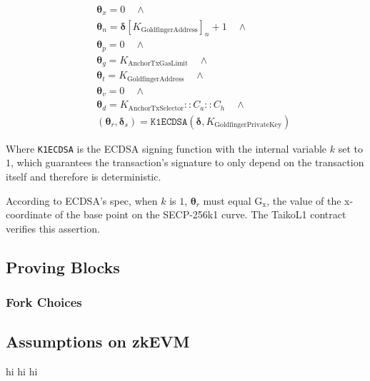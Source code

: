 \documentclass[9pt,oneside]{amsart}
\begin{document}
\begin{multicols}{2}
\begin{eqnarray}
& & \boldsymbol{\theta}_x = 0 \quad \wedge \\
\nonumber& & \boldsymbol{\theta}_n = \boldsymbol{\delta}[K_{\mathrm{GoldfingerAddress}}]_n + 1 \quad \wedge \\
\nonumber& & \boldsymbol{\theta}_p = 0 \quad \wedge \\
\nonumber& & \boldsymbol{\theta}_g = K_{\mathrm{AnchorTxGasLimit}} \quad \wedge \\
\nonumber& & \boldsymbol{\theta}_t = K_{\mathrm{GoldfingerAddress}} \quad \wedge  \\
\nonumber& & \boldsymbol{\theta}_v = 0 \quad \wedge  \\
\nonumber& & \boldsymbol{\theta}_d = K_{\mathrm{AnchorTxSelector}}::C_a::C_h \quad \wedge  \\
\nonumber& & (\boldsymbol{\theta}_r,\boldsymbol{\delta}_s) = \texttt{K1ECDSA}(\boldsymbol{\delta}, K_{\mathrm{GoldfingerPrivateKey}})
\end{eqnarray}

Where \texttt{K1ECDSA} is the ECDSA signing function with the internal variable $k$ set to $1$, which guarantees the transaction's signature to only depend on the transaction itself and therefore is deterministic.

According to ECDSA's spec, when $k$ is $1$, $\boldsymbol{\theta}_r$ must equal $\mathrm{G_x}$, the value of the x-coordinate of the base point on the SECP-256k1 curve. The TaikoL1 contract verifies this assertion.





\subsection{Proving Blocks} \label{sec:proving}





\subsubsection{Fork Choices} \label{sec:forkchoices}






\subsection{Assumptions on zkEVM}
hi hi hi






\end{multicols}
\end{document}
